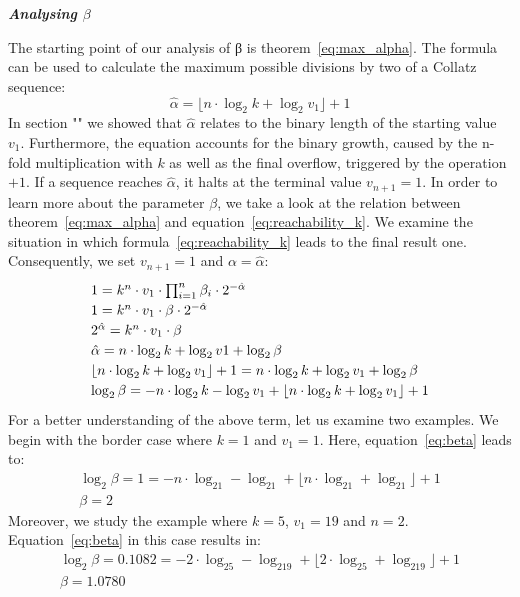\documentclass{SciPress_2015}
\renewcommand{\subsection}[1]{\textit{\textbf{#1}}}
\begin{document}
\subsection{Analysing \boldmath$\beta$}
\par\noindent
The starting point of our analysis of β is theorem~\ref{eq:max_alpha}. The formula can be used to calculate the maximum possible divisions by two of a Collatz sequence:
\[
\hat\alpha=\lfloor n\cdot\log_2k+\log_2v_1\rfloor+1
\]
In section "" we showed that $\hat\alpha$ relates to the binary length of the starting value $v_1$. Furthermore, the equation accounts for the binary growth, caused by the n-fold multiplication with $k$ as well as the final overflow, triggered by the operation $+1$. If a sequence reaches $\hat\alpha$, it halts at the terminal value $v_{n+1}=1$. In order to learn more about the parameter $\beta$, we take a look at the relation between theorem~\ref{eq:max_alpha} and equation~\ref{eq:reachability_k}. We examine the situation in which formula~\ref{eq:reachability_k} leads to the final result one. Consequently, we set $v_{n+1}=1$ and $\alpha=\hat\alpha$:
\begin{equation}
\label{eq:beta}
\def\arraystretch{1.2}\begin{array}{l}
	1=k^n\cdot v_1\cdot\prod_{i=1}^{n}\beta_i\cdot2^{-\hat\alpha}\\
	1=k^n\cdot v_1\cdot\beta\cdot2^{-\hat\alpha}\\
	2^{\hat\alpha}=k^n\cdot v_1\cdot\beta\\
	\hat\alpha=n\cdot\log_2k+\log_2v1+\log_2\beta\\
	\lfloor n\cdot\log_2k+\log_2v_1\rfloor+1=n\cdot\log_2k+\log_2v_1+\log_2\beta\\
	\log_2\beta=-n\cdot\log_2k-\log_2v_1+\lfloor n\cdot\log_2k+\log_2v_1\rfloor+1
\end{array}
\end{equation}
For a better understanding of the above term, let us examine two examples. We begin with the border case where $k=1$ and $v_1=1$. Here, equation~\ref{eq:beta} leads to:
\[
\begin{array}{c}
\log_2\beta=1=-n\cdot\log_21-\log_21+\lfloor n\cdot\log_21+\log_21\rfloor+1\\
\beta=2
\end{array}
\]
Moreover, we study the example where $k=5$, $v_1=19$ and $n=2$. Equation~\ref{eq:beta} in this case results in:
\[
\begin{array}{c}
\log_2\beta=0.1082=-2\cdot\log_25-\log_219+\lfloor 2\cdot\log_25+\log_219\rfloor+1\\
\beta=1.0780
\end{array}
\]
\end{document}
